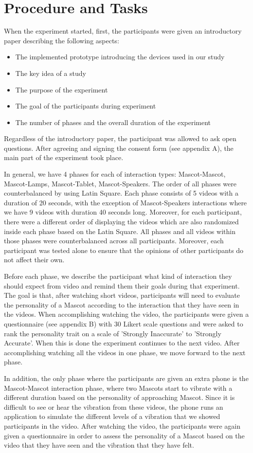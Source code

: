 \section{Procedure and Tasks}
When the experiment started, first, the participants were given an introductory paper describing the following aspects:
\begin{itemize}
  \item The implemented prototype introducing the devices used in our study
  \item The key idea of a study
  \item The purpose of the experiment
  \item The goal of the participants during experiment
  \item The number of phases and the overall duration of the experiment
\end{itemize}

Regardless of the introductory paper, the participant was allowed to ask open questions. After agreeing and signing the consent form (see appendix A), the main part of the experiment took place. 
\par In general, we have 4 phases for each of interaction types: Mascot-Mascot, Mascot-Lamps, Mascot-Tablet, Mascot-Speakers. The order of all phases were counterbalanced by using Latin Square. Each phase consists of 5 videos with a duration of 20 seconds, with the exception of Mascot-Speakers interactions where we have 9 videos with duration 40 seconds long. Moreover, for each participant, there were a different order of displaying the videos which are also randomized inside each phase based on the Latin Square. All phases and all videos within those phases were counterbalanced across all participants. Moreover, each participant was tested alone to ensure that the opinions of other participants do not affect their own. 
\par Before each phase, we describe the participant what kind of interaction they should expect from video and remind them their goals during that experiment. The goal is that, after watching short videos, participants will need to evaluate the personality of a Mascot according to the interaction that they have seen in the videos. When accomplishing watching the video, the participants were given a questionnaire (see appendix B) with 30 Likert scale questions and were asked to rank the personality trait on a scale of 'Strongly Inaccurate' to 'Strongly Accurate'. When this is done the experiment continues to the next video. After accomplishing watching all the videos in one phase, we move forward to the next phase. 
\par In addition, the only phase where the participants are given an extra phone is the Mascot-Mascot interaction phase, where two Mascots start to vibrate with a different duration based on the personality of approaching Mascot. Since it is difficult to see or hear the vibration from these videos, the phone runs an application to simulate the different levels of a vibration that we showed participants in the video. After watching the video, the participants were again given a questionnaire in order to assess the personality of a Mascot based on the video that they have seen and the vibration that they have felt.

